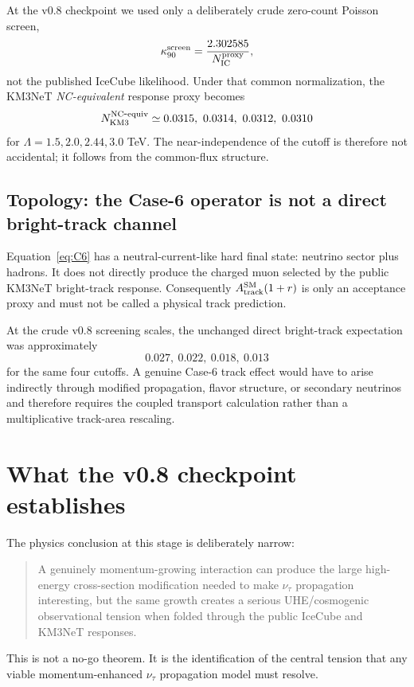 \documentclass[11pt,a4paper]{article}
\begin{document}
At the v0.8 checkpoint we used only a deliberately crude zero-count Poisson
screen,
\begin{equation}
 \kappa_{90}^{\rm screen}={2.302585\over N_{\rm IC}^{\rm proxy}},
 \label{eq:crudescreen}
\end{equation}
not the published IceCube likelihood.  Under that common normalization, the
KM3NeT \emph{NC-equivalent} response proxy becomes
\begin{equation}
 N_{\rm KM3}^{\rm NC\mbox{-}equiv}
 \simeq 0.0315,\ 0.0314,\ 0.0312,\ 0.0310
 \label{eq:kmproxy}
\end{equation}
for $\Lambda=1.5,2.0,2.44,3.0$ TeV.  The near-independence of the cutoff is
therefore not accidental; it follows from the common-flux structure.

\subsection{Topology: the Case-6 operator is not a direct bright-track channel}
Equation~\eqref{eq:C6} has a neutral-current-like hard final state: neutrino
sector plus hadrons.  It does not directly produce the charged muon selected
by the public KM3NeT bright-track response.  Consequently
$A_{\rm track}^{\rm SM}(1+r)$ is only an acceptance proxy and must not be
called a physical track prediction.

At the crude v0.8 screening scales, the unchanged direct bright-track
expectation was approximately
\begin{equation}
 0.027,\ 0.022,\ 0.018,\ 0.013
 \label{eq:directtrack}
\end{equation}
for the same four cutoffs.  A genuine Case-6 track effect would have to arise
indirectly through modified propagation, flavor structure, or secondary
neutrinos and therefore requires the coupled transport calculation rather
than a multiplicative track-area rescaling.

\section{What the v0.8 checkpoint establishes}
The physics conclusion at this stage is deliberately narrow:
\begin{quote}
A genuinely momentum-growing interaction can produce the large high-energy
cross-section modification needed to make $\nu_\tau$ propagation interesting,
but the same growth creates a serious UHE/cosmogenic observational tension
when folded through the public IceCube and KM3NeT responses.
\end{quote}
This is not a no-go theorem.  It is the identification of the central tension
that any viable momentum-enhanced $\nu_\tau$ propagation model must resolve.
\end{document}
